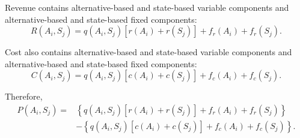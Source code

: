 	Revenue contains alternative-based and state-based variable components and
	alternative-based and state-based fixed components:
	\[
	R(A_i,S_j)
	=
	q(A_i,S_j)
	\left[
	r(A_i)+r(S_j)
	\right]
	+
	f_r(A_i)
	+
	f_r(S_j).
	\]

	Cost also contains alternative-based and state-based variable components and
	alternative-based and state-based fixed components:
	\[
	C(A_i,S_j)
	=
	q(A_i,S_j)
	\left[
	c(A_i)+c(S_j)
	\right]
	+
	f_c(A_i)
	+
	f_c(S_j).
	\]

	Therefore,
	\[
	\begin{aligned}
		P(A_i,S_j)
		={}&
		\left\{
		q(A_i,S_j)
		\left[
		r(A_i)+r(S_j)
		\right]
		+
		f_r(A_i)
		+
		f_r(S_j)
		\right\}
		\\
		&-
		\left\{
		q(A_i,S_j)
		\left[
		c(A_i)+c(S_j)
		\right]
		+
		f_c(A_i)
		+
		f_c(S_j)
		\right\}.
	\end{aligned}
	\]



